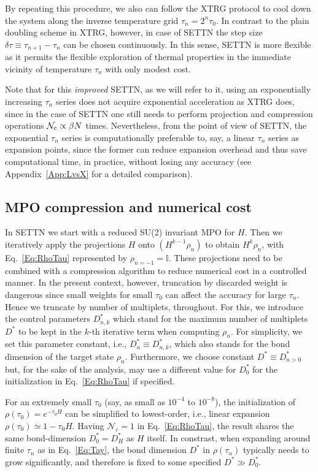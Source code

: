 \documentclass[aps,prx,twocolumn,showpacs,psfig,superscriptaddress,longbibliography]{revtex4-1}
\newcommand{\App}[1]{Appendix~\ref{#1}}
\newcommand{\Eq}[1]{Eq.~\eqref{#1}}
\def\Dstar{D^\ast}
\def\taui{\tau_0}
\def\Dstari{\Dstar_0}
\def\Ncut{\mathcal{N}_{\rm{c}}}
\begin{document}
By repeating this procedure, we also can follow the XTRG protocol to
cool down the  {system} along the inverse temperature grid $\tau_n
= 2^n \taui$.  In contrast to the plain doubling scheme in XTRG,
however, in case of SETTN the step size $\delta\tau \equiv
\tau_{n+1}-\tau_{n}$ can be chosen continuously.  In this sense,
SETTN is more flexible as it permits the flexible exploration of
thermal properties in the immediate vicinity of temperature $\tau_n$
with only modest cost.

Note that for this {\it improved} SETTN, as we will refer to it,
using an exponentially increasing $\tau_n$ series does not acquire
exponential acceleration as XTRG does, since in the case of SETTN
one still needs to perform projection and compression operations
$\Ncut \propto \beta N$ times.  Nevertheless, from the point of view
of SETTN, the exponential $\tau_n$ series is computationally
preferable to, say, a linear $\tau_n$ series as expansion points,
since the former can reduce expansion overhead and thus save
computational time, in practice, without losing any accuracy (see
\App{App:LvsX} for a detailed comparison).

\subsection{MPO compression and numerical cost}
\label{Sec:trunc}

In SETTN we start with a reduced SU(2) invariant MPO for $H$. Then
we iteratively apply the projections $H$ onto $(H^{k-1} \rho_n)$ to
obtain $H^k \rho_n$, with \Eq{Eq:RhoTau} represented by $\rho_{n=-1}
= \mathbb{I}$.  These projections need to be combined with a
compression algorithm to reduce numerical cost in a controlled
manner.  In the present context, however, truncation by discarded
weight is dangerous since small weights for small $\taui$ can affect
the accuracy for large $\tau_n$.  Hence we truncate by number of
multiplets, throughout.  For this, we introduce the control
parameters $\Dstar_{n,k}$ which stand for the maximum number of
multiplets $\Dstar$ to be kept in the $k$-th iterative term when
computing $\rho_{n}$.  For simplicity, we set this parameter
constant, i.e., $\Dstar_{n} \equiv \Dstar_{n,k}$, which also stands
for the bond dimension of the target state $\rho_{n}$. Furthermore,
we choose constant $\Dstar \equiv \Dstar_{n>0}$ but, for the sake
of the analysis, may use a different value for $\Dstari$ for the
initialization in \Eq{Eq:RhoTau} if specified.
 
For an extremely small $\taui$ (say, as small as $10^{-4}$ to
$10^{-8}$), the initialization of $\rho(\taui) =e^{-\taui H}$ can be
simplified to lowest-order, i.e., linear expansion $\rho(\taui)
\simeq 1-\taui H$. Having $\mathcal{N}_c=1$ in \Eq{Eq:RhoTau}, the
result shares the same bond-dimension $\Dstari = \Dstar_H$ as $H$
itself.
%
In constrast, when expanding around finite $\tau_n$ as in
\Eq{Eq:Tay}, the bond dimension $\Dstar$ in $ \rho(\tau_n)$
typically needs to grow significantly, and therefore is fixed to
some specified $\Dstar \gg \Dstari$.
\end{document}
